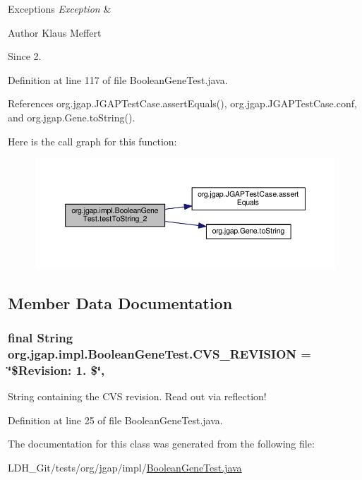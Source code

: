 \begin{DoxyExceptions}{Exceptions}
{\em Exception} & \\
\hline
\end{DoxyExceptions}
\begin{DoxyAuthor}{Author}
Klaus Meffert 
\end{DoxyAuthor}
\begin{DoxySince}{Since}
2. 
\end{DoxySince}


Definition at line 117 of file Boolean\-Gene\-Test.\-java.



References org.\-jgap.\-J\-G\-A\-P\-Test\-Case.\-assert\-Equals(), org.\-jgap.\-J\-G\-A\-P\-Test\-Case.\-conf, and org.\-jgap.\-Gene.\-to\-String().



Here is the call graph for this function\-:
\nopagebreak
\begin{figure}[H]
\begin{center}
\leavevmode
\includegraphics[width=350pt]{classorg_1_1jgap_1_1impl_1_1_boolean_gene_test_a88ca0d100fe9f39ccac97a2300aaf8b9_cgraph}
\end{center}
\end{figure}




\subsection{Member Data Documentation}
\hypertarget{classorg_1_1jgap_1_1impl_1_1_boolean_gene_test_a29015b9bd17fb294aa4c5a1184046bb8}{
\subsubsection[{C\-V\-S\-\_\-\-R\-E\-V\-I\-S\-I\-O\-N}]{\setlength{\rightskip}{0pt plus 5cm}final String org.\-jgap.\-impl.\-Boolean\-Gene\-Test.\-C\-V\-S\-\_\-\-R\-E\-V\-I\-S\-I\-O\-N = \char`\"{}\$Revision\-: 1. \$\char`\"{}\hspace{0.3cm}{\ttfamily [static]}, {\ttfamily [private]}}}\label{classorg_1_1jgap_1_1impl_1_1_boolean_gene_test_a29015b9bd17fb294aa4c5a1184046bb8}
String containing the C\-V\-S revision. Read out via reflection! 

Definition at line 25 of file Boolean\-Gene\-Test.\-java.



The documentation for this class was generated from the following file\-:\begin{DoxyCompactItemize}
\item 
L\-D\-H\-\_\-\-Git/tests/org/jgap/impl/\hyperlink{_boolean_gene_test_8java}{Boolean\-Gene\-Test.\-java}\end{DoxyCompactItemize}
